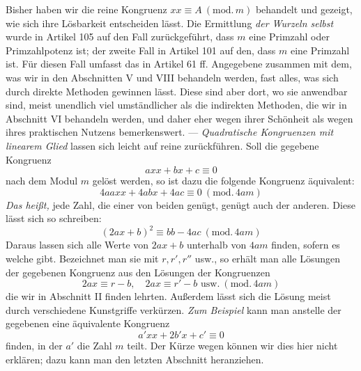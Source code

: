 Bisher haben wir die reine Kongruenz $xx\equiv A\ (\mathrm{mod.}\,m)$ behandelt und gezeigt, wie sich ihre Lösbarkeit entscheiden lässt. Die Ermittlung \textit{der Wurzeln selbst} wurde in Artikel 105 auf den Fall zurückgeführt, dass $m$ eine Primzahl oder Primzahlpotenz ist; der zweite Fall in Artikel 101 auf den, dass $m$ eine Primzahl ist. Für diesen Fall umfasst das in Artikel 61 ff. Angegebene zusammen mit dem, was wir in den Abschnitten V und VIII behandeln werden, fast alles, was sich durch direkte Methoden gewinnen lässt. Diese sind aber dort, wo sie anwendbar sind, meist unendlich viel umständlicher als die indirekten Methoden, die wir in Abschnitt VI behandeln werden, und daher eher wegen ihrer Schönheit als wegen ihres praktischen Nutzens bemerkenswert. --- \textit{Quadratische Kongruenzen mit linearem Glied} lassen sich leicht auf reine zurückführen. Soll die gegebene Kongruenz
\[
axx+bx+c\equiv 0
\]
nach dem Modul $m$ gelöst werden, so ist dazu die folgende Kongruenz äquivalent:
\[
4aaxx+4abx+4ac\equiv 0\ (\mathrm{mod.}\,4am)
\]
\textit{Das heißt,} jede Zahl, die einer von beiden genügt, genügt auch der anderen. Diese lässt sich so schreiben:
\[
(2ax+b)^2\equiv bb-4ac\ (\mathrm{mod.}\,4am)
\]
Daraus lassen sich alle Werte von $2ax+b$ unterhalb von $4am$ finden, sofern es welche gibt. Bezeichnet man sie mit $r,r',r''$ usw., so erhält man alle Lösungen der gegebenen Kongruenz aus den Lösungen der Kongruenzen
\[
2ax\equiv r-b,\quad 2ax\equiv r'-b\text{ usw.}\ (\mathrm{mod.}\,4am)
\]
die wir in Abschnitt II finden lehrten. Außerdem lässt sich die Lösung meist durch verschiedene Kunstgriffe verkürzen. \textit{Zum Beispiel} kann man anstelle der gegebenen eine äquivalente Kongruenz
\[
a'xx+2b'x+c'\equiv 0
\]
finden, in der $a'$ die Zahl $m$ teilt. Der Kürze wegen können wir dies hier nicht erklären; dazu kann man den letzten Abschnitt heranziehen.

\par\endgroup
